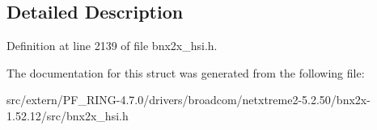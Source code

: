 \subsection{Detailed Description}


Definition at line 2139 of file bnx2x\_\-hsi.h.



The documentation for this struct was generated from the following file:\begin{DoxyCompactItemize}
\item 
src/extern/PF\_\-RING-\/4.7.0/drivers/broadcom/netxtreme2-\/5.2.50/bnx2x-\/1.52.12/src/bnx2x\_\-hsi.h\end{DoxyCompactItemize}
